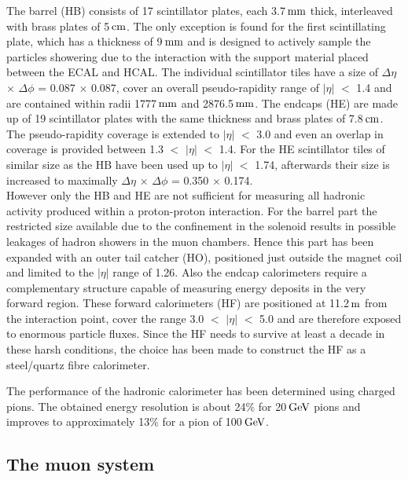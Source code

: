 The barrel (HB) consists of 17 scintillator plates, each 3.7$\, \mathrm{mm}$ thick, interleaved with brass plates of 5$\, \mathrm{cm}$. The only exception is found for the first scintillating plate, which has a thickness of 9$\, \mathrm{mm}$ and is designed to actively sample the particles showering due to the interaction with the support material placed between the ECAL and HCAL. The individual scintillator tiles have a size of $\Delta \eta$ $\times$ $\Delta \phi$ = 0.087 $\times$ 0.087, cover an overall pseudo-rapidity range of $\vert \eta \vert$ $<$ 1.4 and are contained within radii 1777$\, \mathrm{mm}$ and 2876.5$\, \mathrm{mm}$. The endcaps (HE) are made up of 19 scintillator plates with the same thickness and brass plates of 7.8$\, \mathrm{cm}$. The pseudo-rapidity coverage is extended to $\vert \eta \vert$ $<$ 3.0 and even an overlap in coverage is provided between 1.3 $<$ $\vert \eta \vert$ $<$ 1.4. For the HE scintillator tiles of similar size as the HB have been used up to $\vert \eta \vert$ $<$ 1.74, afterwards their size is increased to maximally $\Delta \eta$ $\times$ $\Delta \phi$ = 0.350 $\times$ 0.174.
\\
However only the HB and HE are not sufficient for measuring all hadronic activity produced within a proton-proton interaction. 
For the barrel part the restricted size available due to the confinement in the solenoid results in possible leakages of hadron showers in the muon chambers.
Hence this part has been expanded with an outer tail catcher (HO), positioned just outside the magnet coil and limited to the $\vert \eta \vert$ range of 1.26. Also the endcap calorimeters require a complementary structure capable of measuring energy deposits in the very forward region. These forward calorimeters (HF) are positioned at 11.2$\, \mathrm{m}$ from the interaction point, cover the range 3.0 $<$ $\vert \eta \vert$ $<$ 5.0 and are therefore exposed to enormous particle fluxes. Since the HF needs to survive at least a decade in these harsh conditions, the choice has been made to construct the HF as a steel/quartz fibre calorimeter.

The performance of the hadronic calorimeter has been determined using charged pions. The obtained energy resolution is about 24$\%$ for 20$\, \mathrm{GeV}$ pions and improves to approximately 13$\%$ for a pion of 100$\, \mathrm{GeV}$.

\subsection{The muon system}\label{sec::MuonChamber}

